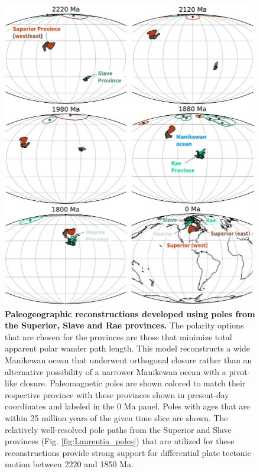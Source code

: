 \documentclass[twocolumn, switch]{article} %
\begin{document}
\begin{figure}
\centering
\includegraphics[width=6 in]{../Figures/Superior_Slave_reconstructions.pdf}
\caption{\textbf{Paleogeographic reconstructions developed using poles from the Superior, Slave and Rae provinces.} The polarity options that are chosen for the provinces are those that minimize total apparent polar wander path length. This model reconstructs a wide Manikewan ocean that underwent orthogonal closure rather than an alternative possibility of a narrower Manikewan ocean with a pivot-like closure. Paleomagnetic poles are shown colored to match their respective province with these provinces shown in present-day coordinates and labeled in the 0 Ma panel. Poles with ages that are within 25 million years of the given time slice are shown. The relatively well-resolved pole paths from the Superior and Slave provinces (Fig. \ref{fig:Laurentia_poles}) that are utilized for these reconstructions provide strong support for differential plate tectonic motion between 2220 and 1850 Ma.}
\label{fig:Superior_Slave_recons}
\end{figure}
\end{document}
